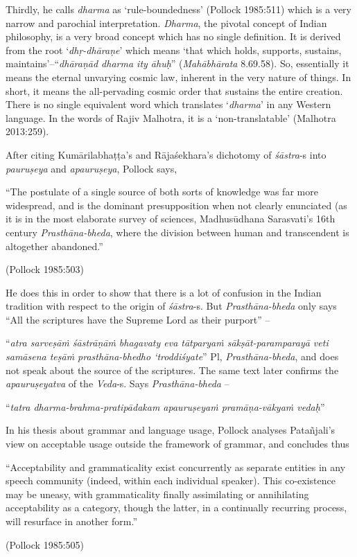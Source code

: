 Thirdly, he calls {\it dharma} as `rule-boundedness' (Pollock 1985:511) which is a very narrow and parochial interpretation. {\it Dharma}, the pivotal concept of Indian philosophy, is a very broad concept which has no single definition. It is derived from the root `\textsl{dhṛ-dhāraṇe}' which means `that which holds, supports, sustains, maintains'--``\textsl{dhāraṇād dharma ity āhuḥ}'' ({\it Mahābhārata} 8.69.58). So, essentially it means the eternal unvarying cosmic law, inherent in the very nature of things. In short, it means the all-pervading cosmic order that sustains the entire creation. There is no single equivalent word which translates `{\it dharma}' in any Western language. In the words of Rajiv Malhotra, it is a `non-translatable' (Malhotra 2013:259).

After citing Kumārilabhaṭṭa's and Rājaśekhara's dichotomy of {\it śāstra}-s into {\it pauruṣeya} and {\it apauruṣeya}, Pollock says,
\begin{myquote}
``The postulate of a single source of both sorts of knowledge was far more widespread, and is the dominant presupposition when not clearly enunciated (as it is in the most elaborate survey of sciences, Madhusūdhana Sarasvati's 16th century {\sl Prasthāna-bheda}, where the division between human and transcendent is altogether abandoned.'' 

\hfill (Pollock 1985:503)
\end{myquote}

He does this in order to show that there is a lot of confusion in the Indian tradition with respect to the origin of {\sl śāstra}-s. But {\sl Prasthāna-bheda} only says ``All the scriptures have the Supreme Lord as their purport'' -- 
\begin{myquote}
``{\sl atra sarveṣāṁ śāstrāṇāṁ bhagavaty eva tātparyaṁ sākṣāt-paramparayā veti samāsena teṣāṁ prasthāna-bhedho `troddiśyate}'' Pl, {\sl Prasthāna-bheda}, and does not speak about the source of the scriptures. The same text later confirms the {\sl apauruṣeyatva} of the {\sl Veda}-s. Says {\sl Prasthāna-bheda} -- 

``{\sl tatra dharma-brahma-pratipādakam apauruṣeyaṁ pramāṇa-vākyaṁ vedaḥ}'' 
\end{myquote}

In his thesis about grammar and language usage, Pollock analyses Patañjali’s view on acceptable usage outside the framework of grammar, and concludes thus
\begin{myquote}
``Acceptability and grammaticality exist concurrently as separate entities in any speech community (indeed, within each individual speaker). This co-existence may be uneasy, with grammaticality finally assimilating or annihilating acceptability as a category, though the latter, in a continually recurring process, will resurface in another form.'' 

\hfill (Pollock 1985:505)
\end{myquote}


